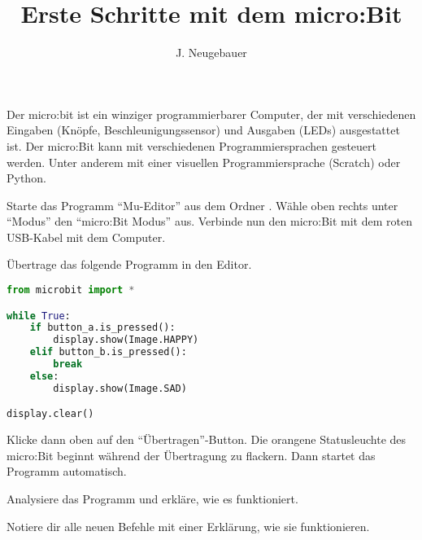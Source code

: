 \documentclass[10pt, a4paper]{scrartcl}
\author{J. Neugebauer}
\title{Erste Schritte mit dem micro:Bit}
\date{\Heute}
\begin{document}
\ReiheTitel

Der micro:bit ist ein winziger programmierbarer Computer, der mit verschiedenen Eingaben (Knöpfe, Beschleunigungssensor) und Ausgaben (LEDs) ausgestattet ist. Der micro:Bit kann mit verschiedenen Programmiersprachen gesteuert werden. Unter anderem mit einer visuellen Programmiersprache (Scratch) oder Python.

\begin{aufgabe}
	Starte das Programm \enquote{Mu-Editor} aus dem Ordner . Wähle oben rechts unter \enquote{Modus} den \enquote{micro:Bit Modus} aus. Verbinde nun den micro:Bit mit dem roten USB-Kabel mit dem Computer.
\end{aufgabe}

\begin{aufgabe}
	Übertrage das folgende Programm in den Editor.
	
	\begin{lstlisting}[language=Python]
from microbit import *

while True:
    if button_a.is_pressed():
        display.show(Image.HAPPY)
    elif button_b.is_pressed():
        break
    else:
        display.show(Image.SAD)

display.clear()
	\end{lstlisting}
	
	Klicke dann oben auf den \enquote{Übertragen}-Button. Die orangene Statusleuchte des micro:Bit beginnt während der Übertragung zu flackern. Dann startet das Programm automatisch.
	
\end{aufgabe}

\begin{aufgabe}
	Analysiere das Programm und erkläre, wie es funktioniert.
	
	Notiere dir alle neuen Befehle mit einer Erklärung, wie sie funktionieren.
\end{aufgabe}
\end{document}
